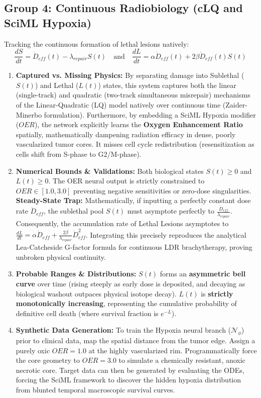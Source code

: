 \documentclass[11pt,a4paper]{article}
\begin{document}
\subsection{Group 4: Continuous Radiobiology (cLQ and SciML Hypoxia)}

Tracking the continuous formation of lethal lesions natively:
\begin{equation}
    \frac{dS}{dt} = \dot{D}_{eff}(t) - \lambda_{repair} S(t) \quad \text{and} \quad \frac{dL}{dt} = \alpha \dot{D}_{eff}(t) + 2\beta \dot{D}_{eff}(t) S(t)
\end{equation}

\begin{enumerate}
    \item \textbf{Captured vs. Missing Physics:} By separating damage into Sublethal ($S(t)$) and Lethal ($L(t)$) states, this system captures both the linear (single-track) and quadratic (two-track simultaneous misrepair) mechanisms of the Linear-Quadratic (LQ) model natively over continuous time (Zaider-Minerbo formulation). Furthermore, by embedding a SciML Hypoxia modifier ($OER$), the network explicitly learns the \textbf{Oxygen Enhancement Ratio} spatially, mathematically dampening radiation efficacy in dense, poorly vascularized tumor cores. It misses cell cycle redistribution (resensitization as cells shift from S-phase to G2/M-phase).
    \item \textbf{Numerical Bounds \& Validations:} Both biological states $S(t) \ge 0$ and $L(t) \ge 0$. The OER neural output is strictly constrained to $OER \in [1.0, 3.0]$ preventing negative sensitivities or zero-dose singularities. \textbf{Steady-State Trap:} Mathematically, if inputting a perfectly constant dose rate $\dot{D}_{eff}$, the sublethal pool $S(t)$ must asymptote perfectly to $\frac{\dot{D}_{eff}}{\lambda_{repair}}$. Consequently, the accumulation rate of Lethal Lesions asymptotes to $\frac{dL}{dt} = \alpha \dot{D}_{eff} + \frac{2\beta}{\lambda_{repair}} \dot{D}_{eff}^2$. Integrating this precisely reproduces the analytical Lea-Catcheside G-factor formula for continuous LDR brachytherapy, proving unbroken physical continuity.
    \item \textbf{Probable Ranges \& Distributions:} $S(t)$ forms an \textbf{asymmetric bell curve} over time (rising steeply as early dose is deposited, and decaying as biological washout outpaces physical isotope decay). $L(t)$ is \textbf{strictly monotonically increasing}, representing the cumulative probability of definitive cell death (where survival fraction is $e^{-L}$).
    \item \textbf{Synthetic Data Generation:} To train the Hypoxia neural branch ($\mathcal{N}_\phi$) prior to clinical data, map the spatial distance from the tumor edge. Assign a purely oxic $OER = 1.0$ at the highly vascularized rim. Programmatically force the core geometry to $OER = 3.0$ to simulate a chemically resistant, anoxic necrotic core. Target data can then be generated by evaluating the ODEs, forcing the SciML framework to discover the hidden hypoxia distribution from blunted temporal macroscopic survival curves.
\end{enumerate}
\end{document}
